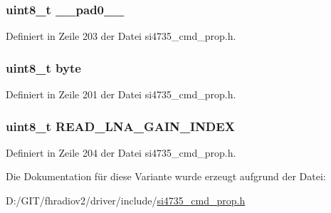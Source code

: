 \subsubsection[{\+\_\+\+\_\+pad0\+\_\+\+\_\+}]{\setlength{\rightskip}{0pt plus 5cm}uint8\+\_\+t \+\_\+\+\_\+pad0\+\_\+\+\_\+}\label{unionfm__agc__status__resp2_a8b4eebe79ded0459acec2f4950102ba3}


Definiert in Zeile 203 der Datei si4735\+\_\+cmd\+\_\+prop.\+h.

\hypertarget{unionfm__agc__status__resp2_a96f44d20f1dbf1c8785a7bc99a46164c}{}
\subsubsection[{byte}]{\setlength{\rightskip}{0pt plus 5cm}uint8\+\_\+t byte}\label{unionfm__agc__status__resp2_a96f44d20f1dbf1c8785a7bc99a46164c}


Definiert in Zeile 201 der Datei si4735\+\_\+cmd\+\_\+prop.\+h.

\hypertarget{unionfm__agc__status__resp2_a294c55f59e45473c7931802535ab68ed}{}
\subsubsection[{R\+E\+A\+D\+\_\+\+L\+N\+A\+\_\+\+G\+A\+I\+N\+\_\+\+I\+N\+D\+E\+X}]{\setlength{\rightskip}{0pt plus 5cm}uint8\+\_\+t R\+E\+A\+D\+\_\+\+L\+N\+A\+\_\+\+G\+A\+I\+N\+\_\+\+I\+N\+D\+E\+X}\label{unionfm__agc__status__resp2_a294c55f59e45473c7931802535ab68ed}


Definiert in Zeile 204 der Datei si4735\+\_\+cmd\+\_\+prop.\+h.



Die Dokumentation für diese Variante wurde erzeugt aufgrund der Datei\+:\begin{DoxyCompactItemize}
\item 
D\+:/\+G\+I\+T/fhradiov2/driver/include/\hyperlink{si4735__cmd__prop_8h}{si4735\+\_\+cmd\+\_\+prop.\+h}\end{DoxyCompactItemize}
